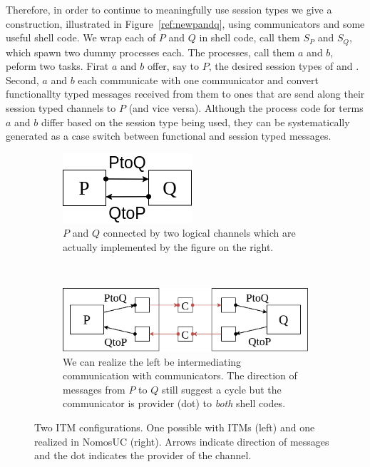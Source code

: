Therefore, in order to continue to meaningfully use session types we give a construction, illustrated in Figure~\ref{ref:newpandq}, using communicators and some useful shell code.
We wrap each of $P$ and $Q$ in shell code, call them $S_P$ and $S_Q$, which spawn two dummy processes each.
The processes, call them $a$ and $b$,  peform two tasks. Firat $a$ and $b$ offer, say to $P$, the desired session types of  and .
Second, $a$ and $b$ each communicate with one communicator and convert functionallty typed messages received from them to ones that are send along their session typed channels to $P$ (and vice versa).
Although the process code for terms $a$ and $b$ differ based on the session type being used, they can be systematically generated as a case switch between functional and session typed messages.
\begin{figure}
	\begin{subfigure}{0.3\textwidth}
	\centering
	\includegraphics[scale=0.4]{figures/p_and_q.png}
	\caption{$P$ and $Q$ connected by two logical channels which are actually implemented by the figure on the right.}
	\label{fig:pandq}
	\end{subfigure}
	~ \ \ \ \ 
	\begin{subfigure}{0.6\textwidth}
	\centering
	\includegraphics[scale=0.4]{figures/new_p_and_q.png}
	\caption{We can realize the left be intermediating communication with communicators. The direction of messages from $P$ to $Q$ still suggest a cycle but the communicator is provider (dot) to \emph{both} shell codes.}
	\label{fig:newpandq}
	\end{subfigure}
	\caption{Two ITM configurations. One possible with ITMs (left) and one realized in NomosUC (right). Arrows indicate direction of messages and the dot indicates the provider of the channel.}
\end{figure}

